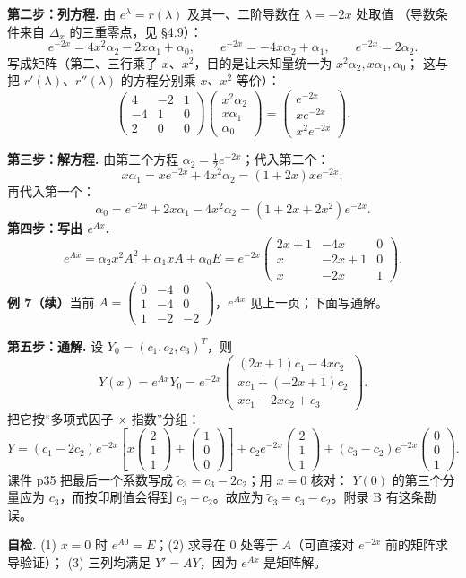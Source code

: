 \documentclass[11pt]{ctexart}
\newcommand{\pmat}[1]{\begin{pmatrix}#1\end{pmatrix}}
\begin{document}
\textbf{第二步：列方程.} 由 $e^{\lambda}=r(\lambda)$ 及其一、二阶导数在 $\lambda=-2x$ 处取值
（导数条件来自 $\Delta_x$ 的三重零点，见 §4.9）：
\[
e^{-2x}=4x^2\alpha_2-2x\alpha_1+\alpha_0,\qquad
e^{-2x}=-4x\alpha_2+\alpha_1,\qquad
e^{-2x}=2\alpha_2 .
\]
写成矩阵（第二、三行乘了 $x$、$x^2$，目的是让未知量统一为 $x^2\alpha_2,x\alpha_1,\alpha_0$；
这与把 $r'(\lambda)$、$r''(\lambda)$ 的方程分别乘 $x$、$x^2$ 等价）：
\[
\pmat{4&-2&1\\-4&1&0\\2&0&0}\pmat{x^2\alpha_2\\x\alpha_1\\\alpha_0}
=\pmat{e^{-2x}\\xe^{-2x}\\x^2e^{-2x}} .
\]

\textbf{第三步：解方程.}
由第三个方程 $\alpha_2=\frac12e^{-2x}$；代入第二个：
\[
x\alpha_1=xe^{-2x}+4x^2\alpha_2=(1+2x)xe^{-2x};
\]
再代入第一个：
\[
\alpha_0=e^{-2x}+2x\alpha_1-4x^2\alpha_2=(1+2x+2x^2)e^{-2x}.
\]
\textbf{第四步：写出 $e^{Ax}$.}
\[
e^{Ax}=\alpha_2x^2A^2+\alpha_1x A+\alpha_0E
=e^{-2x}\pmat{2x+1&-4x&0\\x&-2x+1&0\\x&-2x&1}.
\]
\clearpage
\noindent\textbf{例 7（续）}\quad 当前 $A=\pmat{0&-4&0\\1&-4&0\\1&-2&-2}$，$e^{Ax}$ 见上一页；下面写通解。

\textbf{第五步：通解.} 设 $Y_0=(c_1,c_2,c_3)^T$，则
\[
Y(x)=e^{Ax}Y_0
=e^{-2x}\pmat{(2x+1)c_1-4xc_2\\xc_1+(-2x+1)c_2\\xc_1-2xc_2+c_3}.
\]
把它按“多项式因子 $\times$ 指数”分组：
\[
Y=(c_1-2c_2)e^{-2x}\left[x\pmat{2\\1\\1}+\pmat{1\\0\\0}\right]
+c_2e^{-2x}\pmat{2\\1\\1}
+(c_3-c_2)e^{-2x}\pmat{0\\0\\1}.
\]
课件 p35 把最后一个系数写成 $\tilde c_3=c_3-2c_2$；用 $x=0$ 核对：
$Y(0)$ 的第三个分量应为 $c_3$，而按印刷值会得到 $c_3-c_2$。故应为
$\tilde c_3=c_3-c_2$。附录 B 有这条勘误。

\textbf{自检.} (1) $x=0$ 时 $e^{A0}=E$；(2) 求导在 $0$ 处等于 $A$（可直接对 $e^{-2x}$ 前的矩阵求导验证）；
(3) 三列均满足 $Y'=AY$，因为 $e^{Ax}$ 是矩阵解。
\end{document}
